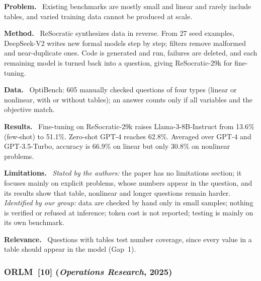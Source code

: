 \documentclass[11pt,a4paper]{article}
\newcommand{\elem}[1]{\par\noindent\textbf{#1.}~}
\begin{document}
\elem{Problem} Existing benchmarks are mostly small and linear and rarely include tables, and varied training data cannot be produced at scale.
\elem{Method} ReSocratic synthesizes data in reverse. From 27 seed examples, DeepSeek-V2 writes new formal models step by step; filters remove malformed and near-duplicate ones. Code is generated and run, failures are deleted, and each remaining model is turned back into a question, giving ReSocratic-29k for fine-tuning.
\elem{Data} OptiBench: 605 manually checked questions of four types (linear or nonlinear, with or without tables); an answer counts only if all variables and the objective match.
\elem{Results} Fine-tuning on ReSocratic-29k raises Llama-3-8B-Instruct from 13.6\% (few-shot) to 51.1\%. Zero-shot GPT-4 reaches 62.8\%. Averaged over GPT-4 and GPT-3.5-Turbo, accuracy is 66.9\% on linear but only 30.8\% on nonlinear problems.
\elem{Limitations} \textit{Stated by the authors:} the paper has no limitations section; it focuses mainly on explicit problems, whose numbers appear in the question, and its results show that table, nonlinear and longer questions remain harder. \textit{Identified by our group:} data are checked by hand only in small samples; nothing is verified or refused at inference; token cost is not reported; testing is mainly on its own benchmark.
\elem{Relevance} Questions with tables test number coverage, since every value in a table should appear in the model (Gap~1).

\subsubsection[ORLM (Operations Research, 2025)]{ORLM~[10] (\textit{Operations Research}, 2025)}
\end{document}
